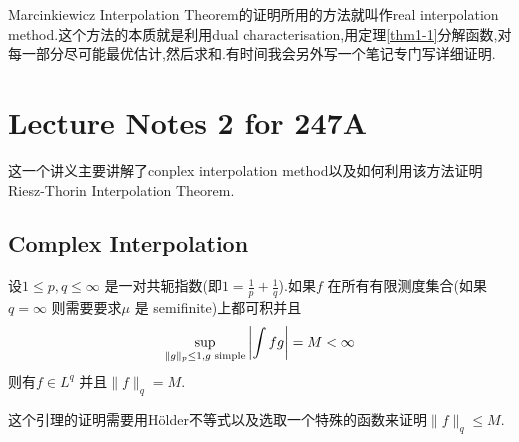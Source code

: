 Marcinkiewicz Interpolation Theorem的证明所用的方法就叫作real interpolation method.这个方法的本质就是利用dual characterisation,用定理\ref{thm1-1}分解函数,对每一部分尽可能最优估计,然后求和.有时间我会另外写一个笔记专门写详细证明.

\section{Lecture Notes 2 for 247A}
这一个讲义主要讲解了conplex interpolation method以及如何利用该方法证明Riesz-Thorin Interpolation Theorem. 
\subsection{Complex Interpolation}
\begin{lemma}
  设$1\le p,q\le \infty$ 是一对共轭指数(即$1=\frac{1}{p}+\frac{1}{q}$).如果$f$ 在所有有限测度集合(如果$q=\infty$ 则需要要求$\mu$ 是 semifinite)上都可积并且
  \[
  \sup_{\|g\|_{p}\le 1,g \text{ \upshape simple}}\left| \int fg \right| =M<\infty
  \] 
  则有$f\in L^{q}$ 并且$\|f\|_q=M$.
\end{lemma}
这个引理的证明需要用H\"{o}lder不等式以及选取一个特殊的函数来证明$\|f\|_q\le M$.

